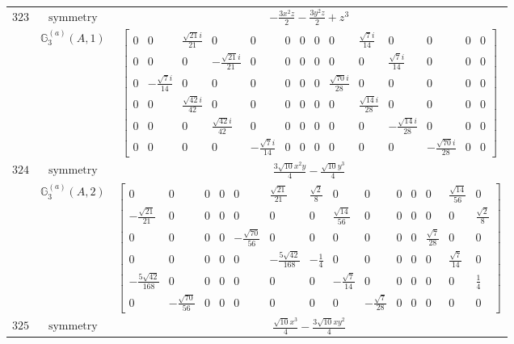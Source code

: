 \documentclass[fleqn,8pt,landscape]{jsarticle}
\begin{document}
\begin{longtable}{ccc}
$ 323 $ & $ \text{symmetry} $ & $ - \frac{3 x^{2} z}{2} - \frac{3 y^{2} z}{2} + z^{3} $ \\
$  $ & $ \mathbb{G}_{3}^{(a)}(A,1) $ & $ \begin{bmatrix} 0 & 0 & \frac{\sqrt{21} i}{21} & 0 & 0 & 0 & 0 & 0 & 0 & \frac{\sqrt{7} i}{14} & 0 & 0 & 0 & 0 \\ 0 & 0 & 0 & - \frac{\sqrt{21} i}{21} & 0 & 0 & 0 & 0 & 0 & 0 & \frac{\sqrt{7} i}{14} & 0 & 0 & 0 \\ 0 & - \frac{\sqrt{7} i}{14} & 0 & 0 & 0 & 0 & 0 & 0 & \frac{\sqrt{70} i}{28} & 0 & 0 & 0 & 0 & 0 \\ 0 & 0 & \frac{\sqrt{42} i}{42} & 0 & 0 & 0 & 0 & 0 & 0 & \frac{\sqrt{14} i}{28} & 0 & 0 & 0 & 0 \\ 0 & 0 & 0 & \frac{\sqrt{42} i}{42} & 0 & 0 & 0 & 0 & 0 & 0 & - \frac{\sqrt{14} i}{28} & 0 & 0 & 0 \\ 0 & 0 & 0 & 0 & - \frac{\sqrt{7} i}{14} & 0 & 0 & 0 & 0 & 0 & 0 & - \frac{\sqrt{70} i}{28} & 0 & 0 \end{bmatrix} $ \\ \hline
$ 324 $ & $ \text{symmetry} $ & $ \frac{3 \sqrt{10} x^{2} y}{4} - \frac{\sqrt{10} y^{3}}{4} $ \\
$  $ & $ \mathbb{G}_{3}^{(a)}(A,2) $ & $ \begin{bmatrix} 0 & 0 & 0 & 0 & 0 & \frac{\sqrt{21}}{21} & \frac{\sqrt{2}}{8} & 0 & 0 & 0 & 0 & 0 & \frac{\sqrt{14}}{56} & 0 \\ - \frac{\sqrt{21}}{21} & 0 & 0 & 0 & 0 & 0 & 0 & \frac{\sqrt{14}}{56} & 0 & 0 & 0 & 0 & 0 & \frac{\sqrt{2}}{8} \\ 0 & 0 & 0 & 0 & - \frac{\sqrt{70}}{56} & 0 & 0 & 0 & 0 & 0 & 0 & \frac{\sqrt{7}}{28} & 0 & 0 \\ 0 & 0 & 0 & 0 & 0 & - \frac{5 \sqrt{42}}{168} & - \frac{1}{4} & 0 & 0 & 0 & 0 & 0 & \frac{\sqrt{7}}{14} & 0 \\ - \frac{5 \sqrt{42}}{168} & 0 & 0 & 0 & 0 & 0 & 0 & - \frac{\sqrt{7}}{14} & 0 & 0 & 0 & 0 & 0 & \frac{1}{4} \\ 0 & - \frac{\sqrt{70}}{56} & 0 & 0 & 0 & 0 & 0 & 0 & - \frac{\sqrt{7}}{28} & 0 & 0 & 0 & 0 & 0 \end{bmatrix} $ \\ \hline
$ 325 $ & $ \text{symmetry} $ & $ \frac{\sqrt{10} x^{3}}{4} - \frac{3 \sqrt{10} x y^{2}}{4} $ \\

\end{longtable}
\end{document}
